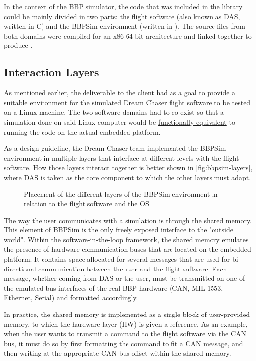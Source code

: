 {In the context of the \gls{BBP} simulator, the code that was included in the library could be mainly divided in two parts: the flight software (also known as \gls{DAS}, written in C) and the \gls{BBPSim} environment (written in \Cpp). The source files from both domains were compiled for an x86 64-bit architecture and linked together to produce .

\subsection*{Interaction Layers}
As mentioned earlier, the deliverable to the client had as a goal to provide a suitable environment for the simulated Dream Chaser flight software to be tested on a Linux machine. The two software domains had to co-exist so that a simulation done on said Linux computer would be \underline{functionally equivalent} to running the code on the actual embedded platform. 

As a design guideline, the Dream Chaser team implemented the \gls{BBPSim} environment in multiple layers that interface at different levels with the flight software. How those layers interact together is better shown in \autoref{fig:bbpsim-layers}, where \gls{DAS} is taken as the core component to which the other layers must adapt.

\begin{figure}[htbp]
	\vspace{12pt}
	\centering
	
	\caption{Placement of the different layers of the BBPSim environment in relation to the flight software and the OS}
	\label{fig:bbpsim-layers}
\end{figure}

The way the user communicates with a simulation is through the shared memory. This element of \gls{BBPSim} is the only freely exposed interface to the "outside world". Within the software-in-the-loop framework, the shared memory emulates the presence of hardware communication buses that are located on the embedded platform. It contains space allocated for several messages that are used for bi-directional communication between the user and the flight software. Each message, whether coming from DAS or the user, must be transmitted on one of the emulated bus interfaces of the real \gls{BBP} hardware (CAN, MIL-1553, Ethernet, Serial) and formatted accordingly.

In practice, the shared memory is implemented as a single block of user-provided memory, to which the hardware layer (HW) is given a reference. As an example, when the user wants to transmit a command to the flight software via the CAN bus, it must do so by first formatting the command to fit a CAN message, and then writing at the appropriate CAN bus offset within the shared memory. 

}
